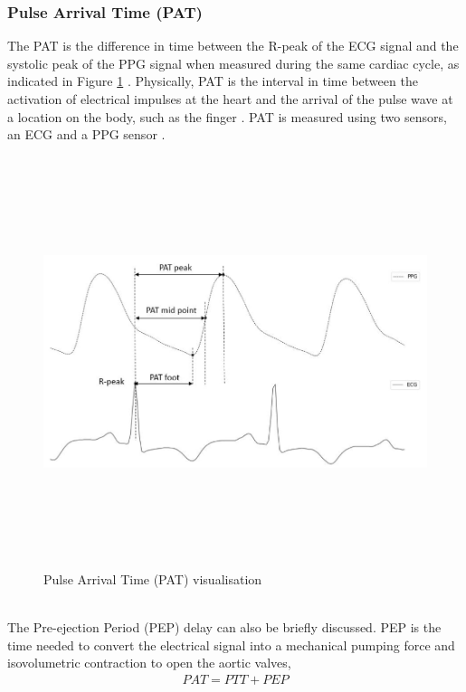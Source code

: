 \documentclass[11pt, a4paper]{article}
\begin{document}
\subsubsection{Pulse Arrival Time (PAT)} 
The PAT is the difference in time between the R-peak of the ECG signal and the systolic peak of the PPG signal when measured during the same cardiac cycle, as indicated in Figure \ref{pat} \cite{ElHajj2020} \cite{Malikeh2019}. Physically, PAT is the interval in time between the activation of electrical impulses at the heart and the arrival of the pulse wave at a location on the body, such as the finger \cite{Jeong2021}. PAT is measured using two sensors, an ECG and a PPG sensor \cite{ElHajj2020}. \begin{figure}[H]
    \centering
    \includegraphics[width=12cm,height=12cm,keepaspectratio]{Figures/pat.png}
    \caption{Pulse Arrival Time (PAT) visualisation \cite{ElHajj2020}}
    \label{pat}
\end{figure} \\ \newline \noindent The Pre-ejection Period (PEP) delay can also be briefly discussed. PEP is the time needed to convert the electrical signal into a mechanical pumping force and isovolumetric contraction to open the aortic valves, \begin{align}
    PAT = PTT + PEP
\end{align}
\end{document}

